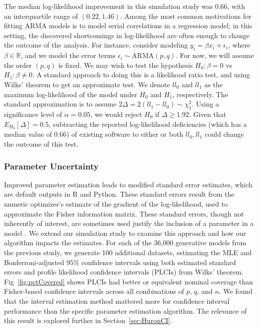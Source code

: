 The median log-likelihood improvement in this simulation study was $0.66$, with an interquartile range of $(0.22, 1.46)$.
Among the most common motivations for fitting ARMA models is to model serial correlations in a regression model; in this setting, the discovered shortcomings in log-likelihood are often enough to change the outcome of the analysis.
For instance, consider modeling $y_i = \beta x_i + \epsilon_i$, where $\beta \in \mathbb{R}$, and we model the error terms $\epsilon_i \sim \text{ARMA}(p, q)$.
For now, we will assume the order $(p, q)$ is fixed.
We may wish to test the hypothesis $H_0: \beta = 0$ vs $H_1: \beta \neq 0$.
A standard approach to doing this is a likelihood ratio test, and using Wilks' theorem to get an approximate test.
We denote $ll_0$ and $ll_1$ as the maximum log-likelihood of the model under $H_0$ and $H_1$, respectively.
The standard approximation is to assume $2\Delta = 2(ll_1 - ll_0) \sim \chi^2_1$.
Using a significance level of $\alpha = 0.05$, we would reject $H_0$ if $\Delta \geq 1.92$.
Given that $E_{H_0}[\Delta] = 0.5$, subtracting the reported log-likelihood deficiencies (which has a median value of $0.66$) of existing software to either or both $ll_0, ll_1$ could change the outcome of this test.

\subsubsection{Parameter Uncertainty}

Improved parameter estimation leads to modified standard error estimates, which are default outputs in R and Python.
These standard errors result from the numeric optimizer's estimate of the gradient of the log-likelihood, used to approximate the Fisher information matrix.
These standard errors, though not inherently of interest, are sometimes used justify the inclusion of a parameter in a model \cite[Chatper~9]{brockwell1991}.
We extend our simulation study to examine this approach and how our algorithm impacts the estimates.
For each of the 36,000 generative models from the previous study, we generate 100 additional datasets, estimating the MLE and Bonferroni-adjusted $95\%$ confidence intervals using both estimated standard errors and profile likelihood confidence intervals (PLCIs) from Wilks' theorem.
Fig~\ref{fig:pctCovered} shows PLCIs had better or equivalent nominal coverage than Fisher-based confidence intervals across all combinations of $p$, $q$, and $n$. We found that the interval estimation method mattered more for confidence interval performance than the specific parameter estimation algorithm.
The relevance of this result is explored further in Section~\ref{sec:HuronCI}.

